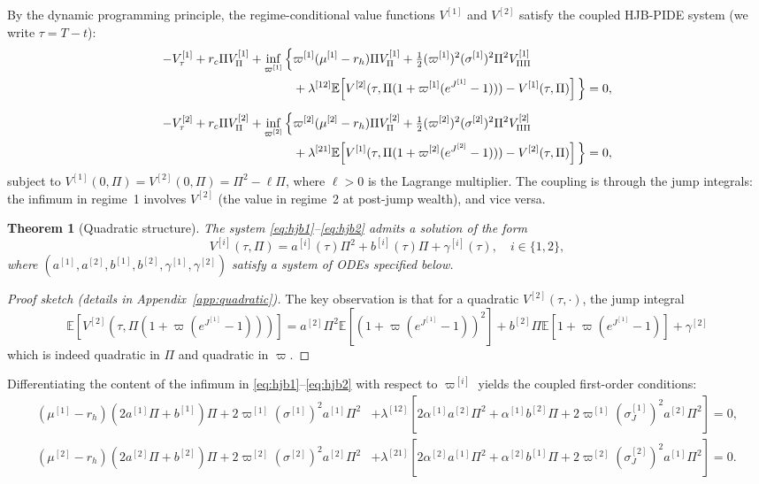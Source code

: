 \documentclass[11pt,a4paper]{article}
\numberwithin{equation}{section}
\newtheorem{theorem}{Theorem}[section]
\newcommand{\E}{\mathbb{E}}
\begin{document}
By the dynamic programming principle, the regime-conditional value functions $V^{[1]}$ and $V^{[2]}$ satisfy the coupled HJB-PIDE system (we write $\tau = T - t$):
\begin{align}
-V^{[1]}_\tau + r_c\Pi V^{[1]}_\Pi + \inf_{\varpi^{[1]}} \Big\{& \varpi^{[1]}(\mu^{[1]} - r_h)\Pi V^{[1]}_\Pi + \tfrac{1}{2}(\varpi^{[1]})^2 (\sigma^{[1]})^2 \Pi^2 V^{[1]}_{\Pi\Pi} \notag \\
& + \lambda^{[12]} \E\!\left[V^{[2]}(\tau, \Pi(1+\varpi^{[1]}(e^{J^{[1]}}-1))) - V^{[1]}(\tau, \Pi)\right] \Big\} = 0, \label{eq:hjb1} \\[6pt]
-V^{[2]}_\tau + r_c\Pi V^{[2]}_\Pi + \inf_{\varpi^{[2]}} \Big\{& \varpi^{[2]}(\mu^{[2]} - r_h)\Pi V^{[2]}_\Pi + \tfrac{1}{2}(\varpi^{[2]})^2 (\sigma^{[2]})^2 \Pi^2 V^{[2]}_{\Pi\Pi} \notag \\
& + \lambda^{[21]} \E\!\left[V^{[1]}(\tau, \Pi(1+\varpi^{[2]}(e^{J^{[2]}}-1))) - V^{[2]}(\tau, \Pi)\right] \Big\} = 0, \label{eq:hjb2}
\end{align}
subject to $V^{[1]}(0, \Pi) = V^{[2]}(0, \Pi) = \Pi^2 - \ell \Pi$, where $\ell > 0$ is the Lagrange multiplier. The coupling is through the jump integrals: the infimum in regime~1 involves $V^{[2]}$ (the value in regime~2 at post-jump wealth), and vice versa.


\begin{theorem}[Quadratic structure]\label{thm:quadratic_ansatz}
The system \eqref{eq:hjb1}--\eqref{eq:hjb2} admits a solution of the form
\begin{equation}\label{eq:ansatz}
V^{[i]}(\tau, \Pi) = a^{[i]}(\tau) \Pi^2 + b^{[i]}(\tau) \Pi + \gamma^{[i]}(\tau), \quad i \in \{1,2\},
\end{equation}
where $(a^{[1]}, a^{[2]}, b^{[1]}, b^{[2]}, \gamma^{[1]}, \gamma^{[2]})$ satisfy a system of ODEs specified below.
\end{theorem}

\begin{proof}[Proof sketch (details in Appendix~\ref{app:quadratic})]
The key observation is that for a quadratic $V^{[2]}(\tau, \cdot)$, the jump integral
\[
\E\!\left[V^{[2]}(\tau, \Pi(1+\varpi(e^{J^{[1]}}-1)))\right]
= a^{[2]} \Pi^2 \E[(1+\varpi(e^{J^{[1]}}-1))^2] + b^{[2]} \Pi \E[1+\varpi(e^{J^{[1]}}-1)] + \gamma^{[2]}
\]
which is indeed quadratic in $\Pi$ and quadratic in $\varpi$.
\end{proof}


Differentiating the content of the infimum in \eqref{eq:hjb1}--\eqref{eq:hjb2} with respect to $\varpi^{[i]}$ yields the coupled first-order conditions:
\begin{align*}
(\mu^{[1]} - r_h)(2a^{[1]}\Pi + b^{[1]})\Pi + 2\varpi^{[1]} (\sigma^{[1]})^2 a^{[1]} \Pi^2
&+ \lambda^{[12]}\!\left[2\alpha^{[1]} a^{[2]} \Pi^2 + \alpha^{[1]} b^{[2]} \Pi + 2\varpi^{[1]} (\sigma_J^{[1]})^2 a^{[2]} \Pi^2\right] = 0, \\
(\mu^{[2]} - r_h)(2a^{[2]}\Pi + b^{[2]})\Pi + 2\varpi^{[2]} (\sigma^{[2]})^2 a^{[2]} \Pi^2
&+ \lambda^{[21]}\!\left[2\alpha^{[2]} a^{[1]} \Pi^2 + \alpha^{[2]} b^{[1]} \Pi + 2\varpi^{[2]} (\sigma_J^{[2]})^2 a^{[1]} \Pi^2\right] = 0. 
\end{align*}
\end{document}

